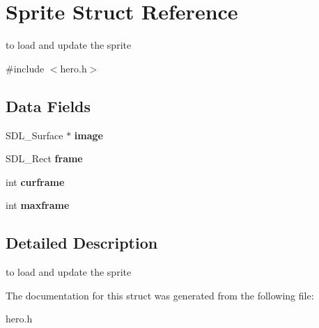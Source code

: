 \hypertarget{structSprite}{}\section{Sprite Struct Reference}
\label{structSprite}


to load and update the sprite  




{\ttfamily \#include $<$hero.\+h$>$}

\subsection*{Data Fields}
\begin{DoxyCompactItemize}
\item 
\mbox{\label{structSprite_a80402c358e003c422aa75bec2b6d0099}} 
S\+D\+L\+\_\+\+Surface $\ast$ {\bfseries image}
\item 
\mbox{\label{structSprite_a3dab174a504c158e143e41960b7354f6}} 
S\+D\+L\+\_\+\+Rect {\bfseries frame}
\item 
\mbox{\label{structSprite_a17956b3b5b551706a5aedde0bd06a234}} 
int {\bfseries curframe}
\item 
\mbox{\label{structSprite_a0bbc4bad956af279f94539d476d9b9d2}} 
int {\bfseries maxframe}
\end{DoxyCompactItemize}


\subsection{Detailed Description}
to load and update the sprite 

The documentation for this struct was generated from the following file\+:\begin{DoxyCompactItemize}
\item 
hero.\+h\end{DoxyCompactItemize}
